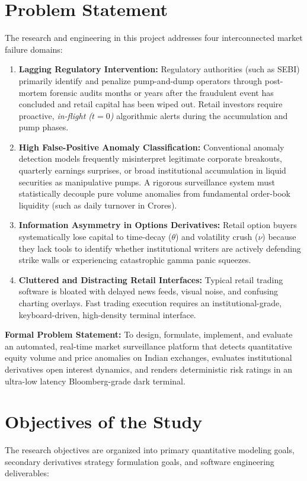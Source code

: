 \section{Problem Statement}
The research and engineering in this project addresses four interconnected market failure domains:

\begin{enumerate}
    \item \textbf{Lagging Regulatory Intervention:} Regulatory authorities (such as SEBI) primarily identify and penalize pump-and-dump operators through post-mortem forensic audits months or years after the fraudulent event has concluded and retail capital has been wiped out. Retail investors require proactive, \textit{in-flight ($t=0$)} algorithmic alerts during the accumulation and pump phases.
    \item \textbf{High False-Positive Anomaly Classification:} Conventional anomaly detection models frequently misinterpret legitimate corporate breakouts, quarterly earnings surprises, or broad institutional accumulation in liquid securities as manipulative pumps. A rigorous surveillance system must statistically decouple pure volume anomalies from fundamental order-book liquidity (such as daily turnover in Crores).
    \item \textbf{Information Asymmetry in Options Derivatives:} Retail option buyers systematically lose capital to time-decay ($\theta$) and volatility crush ($\nu$) because they lack tools to identify whether institutional writers are actively defending strike walls or experiencing catastrophic gamma panic squeezes.
    \item \textbf{Cluttered and Distracting Retail Interfaces:} Typical retail trading software is bloated with delayed news feeds, visual noise, and confusing charting overlays. Fast trading execution requires an institutional-grade, keyboard-driven, high-density terminal interface.
\end{enumerate}

\noindent \textbf{Formal Problem Statement:} To design, formulate, implement, and evaluate an automated, real-time market surveillance platform that detects quantitative equity volume and price anomalies on Indian exchanges, evaluates institutional derivatives open interest dynamics, and renders deterministic risk ratings in an ultra-low latency Bloomberg-grade dark terminal.

\section{Objectives of the Study}
The research objectives are organized into primary quantitative modeling goals, secondary derivatives strategy formulation goals, and software engineering deliverables:


